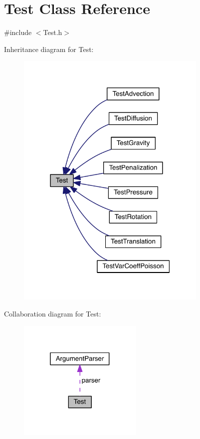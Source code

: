 \hypertarget{class_test}{}\section{Test Class Reference}
\label{class_test}


{\ttfamily \#include $<$Test.\+h$>$}



Inheritance diagram for Test\+:\nopagebreak
\begin{figure}[H]
\begin{center}
\leavevmode
\includegraphics[width=259pt]{d1/d05/class_test__inherit__graph}
\end{center}
\end{figure}


Collaboration diagram for Test\+:\nopagebreak
\begin{figure}[H]
\begin{center}
\leavevmode
\includegraphics[width=169pt]{dd/d5e/class_test__coll__graph}
\end{center}
\end{figure}
